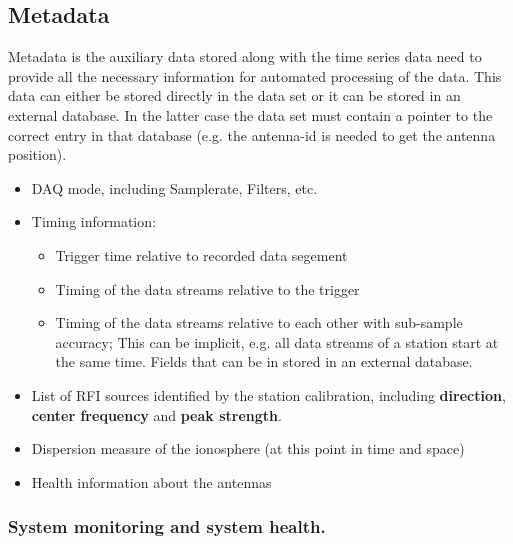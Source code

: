 \documentclass[a4paper,10pt,bibtotoc]{scrartcl}
\begin{document}
\subsection{Metadata}
\label{sec:metadata}

Metadata is the auxiliary data stored along with the time series data need to
provide all the necessary information for automated processing of the data.
This data can either be stored directly in the data set or it can be stored
in an external database. In the latter case the data set must contain a
pointer to the correct entry in that database (e.g. the antenna-id is needed
to get the antenna position).

\begin{itemize} \parskip 0pt
\item DAQ mode, including Samplerate, Filters, etc.
\item Timing information:
  \begin{itemize}
  \item Trigger time relative to recorded data segement
  \item Timing of the data streams relative to the trigger
  \item Timing of the data streams relative to each other with sub-sample
    accuracy; This can be implicit, e.g. all data streams of a station start
    at the same time. Fields that can be in stored in an external database.
  \end{itemize}
\item List of RFI sources identified by the station calibration, including
  \textbf{direction}, \textbf{center frequency} and \textbf{peak strength}.
\item Dispersion measure of the ionosphere (at this point in time and space)
\item Health information about the antennas
\end{itemize}

\subsubsection{System monitoring and system health.}
\end{document}

